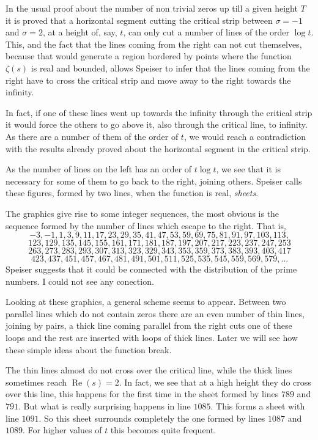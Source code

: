 \documentclass[a4paper]{amsart}
\numberwithin{equation}{section}
\def\Re{\operatorname{\text{Re}}}
\begin{document}
\begin{large}
In the usual proof about the number of non trivial zeros up till a
given height $T$ it is proved that a horizontal segment cutting
the critical strip between $\sigma=-1$ and $\sigma=2$, at a height
of, say, $t$, can only cut a number of lines of the order $\log
t$. This, and the fact that the lines coming from the right can
not cut themselves, because that would generate a region bordered
by points where the function $\zeta(s)$ is real and bounded,
allows Speiser to infer that the lines coming from the right have to
cross the critical strip and move away to the right towards the
infinity.

In fact, if one of these lines went up towards the infinity through the critical
strip it would force the others to go above it, also through the critical line,
to infinity. As there are a number of them of the order of $t$, we would reach
a contradiction with the results already proved about the horizontal segment in
the critical strip.


As the number of lines on the left has an order of $t\log t$, we see that it is
necessary for some of them to go back to the right, joining others. Speiser
calls these figures, formed by two lines, when the function is real, 
{\sl sheets}.

\medskip

The graphics give rise to some integer sequences, the most obvious is the
sequence formed by the number of lines which escape to the right. That is,
$$ -3, -1, 1, 3, 9, 11, 17, 23, 29, 35, 41, 47, 53, 59, 69, 75, 81,
91, 97, 103, 113,$$
$$123, 129, 135, 145, 155, 161, 171, 181, 187, 197, 
207, 217, 223, 237, 247, 253$$
$$263, 273, 283, 293, 307, 313, 323, 329, 343, 353, 359, 373, 383, 
393, 403, 417$$
$$423, 437, 451, 457, 467, 481, 491, 501, 511, 525, 535, 545, 559, 
569, 579,\dots$$
Speiser suggests that it could be connected with the distribution of the prime
numbers. I could  not see any conection.

Looking at these graphics, a general scheme seems to appear. Between two
parallel lines which do not contain zeros there are an even number of thin
lines, joining by pairs, a thick line coming parallel from the right cuts one
of these loops and the rest are inserted with loops of thick lines. Later we
will see how these simple ideas about the function break.

The thin lines almost do not cross over the critical line, while the thick
lines sometimes reach $\Re(s)=2$. In fact, we see that at a high height they do
cross over this line, this happens for the first time in the sheet formed by
lines $789$ and $791$. But what is really surprising happens in line $1085$.
This forms a sheet with line $1091$. So this sheet surrounds completely the one
formed by lines $1087$ and $1089$. For higher values of $t$ this becomes
quite frequent.
\goodbreak





\end{large}
\end{document}

